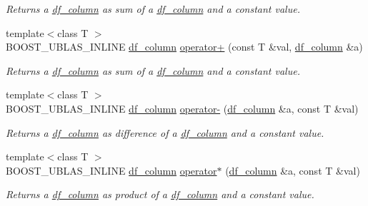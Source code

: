 \begin{DoxyCompactItemize}
\begin{DoxyCompactList}\small\item\em Returns a \hyperlink{classboost_1_1numeric_1_1ublas_1_1df__column}{df\+\_\+column} as sum of a \hyperlink{classboost_1_1numeric_1_1ublas_1_1df__column}{df\+\_\+column} and a constant value. \end{DoxyCompactList}\item 
{\footnotesize template$<$class T $>$ }\\B\+O\+O\+S\+T\+\_\+\+U\+B\+L\+A\+S\+\_\+\+I\+N\+L\+I\+NE \hyperlink{classboost_1_1numeric_1_1ublas_1_1df__column}{df\+\_\+column} \hyperlink{namespaceboost_1_1numeric_1_1ublas_a50606f185ceb02fb0c5c10a23788447b}{operator+} (const T \&val, \hyperlink{classboost_1_1numeric_1_1ublas_1_1df__column}{df\+\_\+column} \&a)
\begin{DoxyCompactList}\small\item\em Returns a \hyperlink{classboost_1_1numeric_1_1ublas_1_1df__column}{df\+\_\+column} as sum of a \hyperlink{classboost_1_1numeric_1_1ublas_1_1df__column}{df\+\_\+column} and a constant value. \end{DoxyCompactList}\item 
{\footnotesize template$<$class T $>$ }\\B\+O\+O\+S\+T\+\_\+\+U\+B\+L\+A\+S\+\_\+\+I\+N\+L\+I\+NE \hyperlink{classboost_1_1numeric_1_1ublas_1_1df__column}{df\+\_\+column} \hyperlink{namespaceboost_1_1numeric_1_1ublas_ad73b7fb3d11e31ce06f729e108c254b2}{operator-\/} (\hyperlink{classboost_1_1numeric_1_1ublas_1_1df__column}{df\+\_\+column} \&a, const T \&val)
\begin{DoxyCompactList}\small\item\em Returns a \hyperlink{classboost_1_1numeric_1_1ublas_1_1df__column}{df\+\_\+column} as difference of a \hyperlink{classboost_1_1numeric_1_1ublas_1_1df__column}{df\+\_\+column} and a constant value. \end{DoxyCompactList}\item 
{\footnotesize template$<$class T $>$ }\\B\+O\+O\+S\+T\+\_\+\+U\+B\+L\+A\+S\+\_\+\+I\+N\+L\+I\+NE \hyperlink{classboost_1_1numeric_1_1ublas_1_1df__column}{df\+\_\+column} \hyperlink{namespaceboost_1_1numeric_1_1ublas_a8ad96e0ddb1935d3bb727962de2b0d10}{operator$\ast$} (\hyperlink{classboost_1_1numeric_1_1ublas_1_1df__column}{df\+\_\+column} \&a, const T \&val)
\begin{DoxyCompactList}\small\item\em Returns a \hyperlink{classboost_1_1numeric_1_1ublas_1_1df__column}{df\+\_\+column} as product of a \hyperlink{classboost_1_1numeric_1_1ublas_1_1df__column}{df\+\_\+column} and a constant value. \end{DoxyCompactList}\item 

\end{DoxyCompactItemize}
